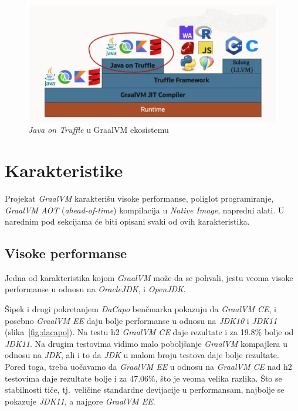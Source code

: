 \documentclass[a4paper]{article}
\begin{document}
\begin{figure}
	\begin{center}
	\includegraphics[scale=0.35]{imgs/java_on_truffle.png}
	\end{center}
	\caption{\emph{Java on Truffle} u GraalVM ekosistemu}
	\label{fig: java on truffle}
\end{figure}



\section{Karakteristike}
\label{sec:Karakteristike}

Projekat \emph{GraalVM} karakterišu visoke performanse, poliglot programiranje, \emph{GraalVM AOT} (\emph{ahead-of-time}) kompilacija u \emph{Native Image}, napredni alati\cite{graalvm}. U narednim pod sekcijama će biti opisani svaki od ovih karakteristika.

\subsection{Visoke performanse}
\label{sub:perf}

Jedna od karakteristika kojom \emph{GraalVM} može da se pohvali, jestu veoma visoke performanse u odnosu na \emph{OracleJDK}, i \emph{OpenJDK}. 

Šipek i drugi \cite{vsipek19} pokretanjem \emph{DaCapo} benčmarka \cite{dacapo} pokazuju da \emph{GraalVM CE}, i posebno \emph{GraalVM EE} daju bolje performanse u odnosu na \emph{JDK10} i \emph{JDK11} (slika~\ref{fig:dacapo}). Na testu h2 \emph{GraalVM CE} daje rezultate i za 19.8\% bolje od \emph{JDK11}. Na drugim testovima vidimo malo poboljšanje \emph{GraalVM} kompajlera u odnosu na \emph{JDK}, ali i to da \emph{JDK} u malom broju testova daje bolje rezultate. Pored toga, treba uočavamo da \emph{GraalVM EE} u odnosu na \emph{GraalVM CE} nad h2 testovima daje rezultate bolje i za 47.06\%, što je veoma velika razlika. Što se stabilnosti tiče, tj.\ veličine standardne devijacije u performansam, najbolje se pokazuje \emph{JDK11}, a najgore \emph{GraalVM EE}.
\end{document}
